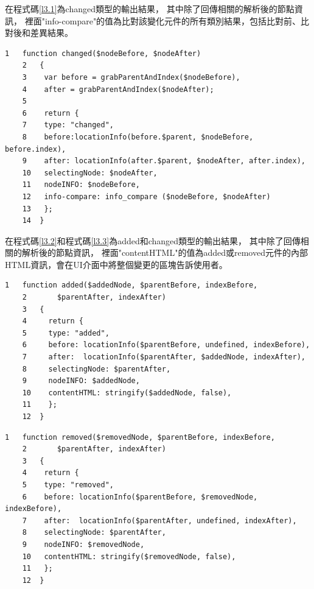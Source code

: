 在程式碼\ref{l3.1}為changed類型的輸出結果，
其中除了回傳相關的解析後的節點資訊，
裡面"info-compare"的值為比對該變化元件的所有類別結果，包括比對前、比對後和差異結果。

\begin{lstlisting}[caption=比對輸出結果(changed類型), label={l3.1}]
    1   function changed($nodeBefore, $nodeAfter) 
    2   {
    3    var before = grabParentAndIndex($nodeBefore),
    4    after = grabParentAndIndex($nodeAfter);
    5
    6    return {
    7    type: "changed",
    8    before:locationInfo(before.$parent, $nodeBefore, before.index),
    9    after: locationInfo(after.$parent, $nodeAfter, after.index),
    10   selectingNode: $nodeAfter,
    11   nodeINFO: $nodeBefore,
    12   info-compare: info_compare ($nodeBefore, $nodeAfter)
    13   };
    14  }
\end{lstlisting}

在程式碼\ref{l3.2}和程式碼\ref{l3.3}為added和changed類型的輸出結果，
其中除了回傳相關的解析後的節點資訊，
裡面"contentHTML"的值為added或removed元件的內部HTML資訊，會在UI介面中將整個變更的區塊告訴使用者。

\begin{lstlisting}[caption=比對輸出結果(added類型), label={l3.2}]
    1   function added($addedNode, $parentBefore, indexBefore, 
    2       $parentAfter, indexAfter) 
    3   {
    4     return {
    5     type: "added",
    6     before: locationInfo($parentBefore, undefined, indexBefore),
    7     after:  locationInfo($parentAfter, $addedNode, indexAfter),
    8     selectingNode: $parentAfter,
    9     nodeINFO: $addedNode,
    10    contentHTML: stringify($addedNode, false),
    11    };
    12  }
\end{lstlisting}

\begin{lstlisting}[caption=比對輸出結果(removed類型), label={l3.3}]
    1   function removed($removedNode, $parentBefore, indexBefore, 
    2       $parentAfter, indexAfter) 
    3   {
    4    return {
    5    type: "removed",
    6    before: locationInfo($parentBefore, $removedNode, indexBefore),
    7    after:  locationInfo($parentAfter, undefined, indexAfter),
    8    selectingNode: $parentAfter,
    9    nodeINFO: $removedNode,
    10   contentHTML: stringify($removedNode, false),
    11   };
    12  }
\end{lstlisting}


